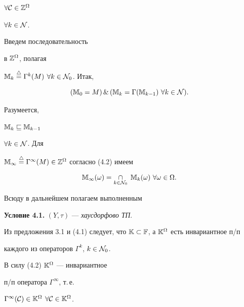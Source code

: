 $\forall{\cal C} \in {{\Bbb Z}^{\Omega}}$


$\forall{k} \in {\cal N}$.


Введем последовательность


в ${\Bbb Z}^{\Omega}$, полагая 


${{\Bbb M}_k}\overset{\triangle}{=}{}{{\Gamma}^k}(M)$ $\forall{k} \in {{\cal N}_0}$. Итак,


\begin{equation}


({{\Bbb M}_0} = M)\, \&\, (


{{\Bbb M}_k} = {\Gamma}({\Bbb M}_{k-1})\ \forall{k} \in {\cal N}).


\end{equation}


Разумеется, 


${{\Bbb M}_k}\sqsubseteq{{\Bbb M}_{k-1}}$


$\forall{k} \in {\cal N}$. Для


${{\Bbb M}_\infty}\stac {{\Gamma}^\infty}(M) \in


{{\Bbb Z}^{\Omega}}$ согласно (4.2) имеем


\begin{equation}


{{\Bbb M}_\infty}(\omega) = \mathop{\cap}\limits_{k \in {{\cal N}_0}}\;


{{\Bbb M}_k}(\omega)\ \forall{\omega} \in \Omega.


\end{equation}


Всюду в дальнейшем полагаем выполненным


\medskip





{\bf Условие 4.1.} $(Y,\tau)$ --- {\it хаусдорфово ТП}.


\medskip





Из предложения 3.1 и (4.1) следует, что ${\Bbb K} \subset


{\Bbb F}$, а ${\Bbb K}^\Omega$ есть инвариантное п/п


каждого из операторов ${{\Gamma}^k}$, $k \in {{\cal N}_0}$.


В силу (4.2) ${\Bbb K}^\Omega$ --- инвариантное


п/п оператора ${\Gamma}^\infty$, т.\,е.


${{\Gamma}^\infty}({\cal C}) \in


{{\Bbb K}^{\Omega}}$ $\forall{\cal C} \in {{\Bbb K}^\Omega}$.


